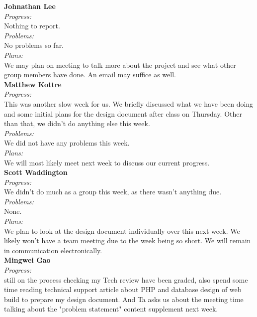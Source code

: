 \noindent\textbf{Johnathan Lee}\\
\noindent\textit{Progress:}\\
Nothing to report.\\

\noindent\textit{Problems:}\\
\noindent No problems so far.\\

\noindent\textit{Plans:}\\
\noindent We may plan on meeting to talk more about the project and see what other group members have done. An email may suffice as well.\\

\noindent\textbf{Matthew Kottre}\\
\noindent\textit{Progress:}\\
This was another slow week for us. We briefly discussed what we have been doing and some initial plans for the design document after class on Thursday. Other than that, we didn't do anything else this week.\\

\noindent\textit{Problems:}\\
\noindent We did not have any problems this week.\\

\noindent\textit{Plans:}\\
\noindent We will most likely meet next week to discuss our current progress.\\

\noindent\textbf{Scott Waddington}\\
\noindent\textit{Progress:}\\
We didn't do much as a group this week, as there wasn't anything due.\\

\noindent\textit{Problems:}\\
\noindent None.\\

\noindent\textit{Plans:}\\
\noindent We plan to look at the design document individually over this next week. We likely won't have a team meeting due to the week being so short. We will remain in communication electronically.\\

\noindent\textbf{Mingwei Gao}\\
\noindent\textit{Progress:}\\
 still on the process checking my Tech review have been graded, also spend some time reading technical support article about PHP and database design of web build to prepare my design document. And Ta asks us about the meeting time talking about the "problem statement" content supplement next week.\\

